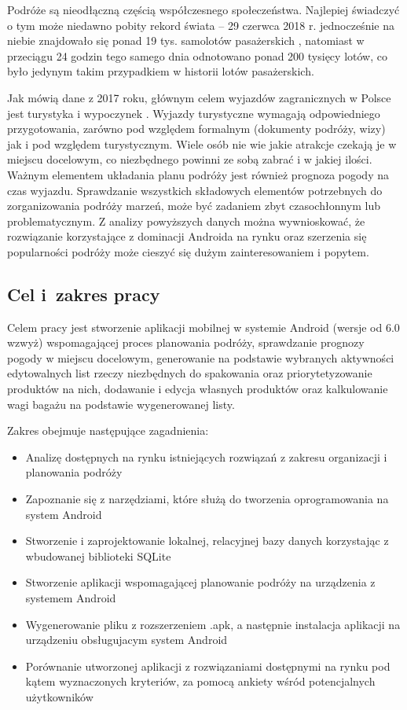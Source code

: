 \documentclass[a4paper,12pt]{article}
\begin{document}
Podróże są nieodłączną częścią współczesnego społeczeństwa. Najlepiej świadczyć o tym może niedawno pobity rekord świata – 29 czerwca 2018 r. jednocześnie na niebie znajdowało się ponad 19 tys. samolotów pasażerskich \cite{flightradar}, natomiast w przeciągu 24 godzin tego samego dnia odnotowano ponad 200 tysięcy lotów\cite{flightradar}, co było jedynym takim przypadkiem w historii lotów pasażerskich.

Jak mówią dane z 2017 roku, głównym celem wyjazdów zagranicznych w Polsce jest turystyka i wypoczynek \cite{msit}. Wyjazdy turystyczne wymagają odpowiedniego przygotowania, zarówno pod względem formalnym (dokumenty podróży, wizy) jak i pod względem turystycznym. Wiele osób nie wie jakie atrakcje czekają je w miejscu docelowym, co niezbędnego powinni ze sobą zabrać i w jakiej ilości. Ważnym elementem układania planu podróży jest również prognoza pogody na czas wyjazdu. Sprawdzanie wszystkich składowych elementów potrzebnych do zorganizowania podróży marzeń, może być zadaniem zbyt czasochłonnym lub problematycznym. Z analizy powyższych danych można wywnioskować, że rozwiązanie korzystające z dominacji Androida na rynku oraz szerzenia się popularności podróży może cieszyć się dużym zainteresowaniem i popytem.

\subsection{Cel i~zakres pracy}
Celem pracy jest stworzenie aplikacji mobilnej w systemie Android (wersje od 6.0 wzwyż) wspomagającej proces planowania podróży, sprawdzanie prognozy pogody w miejscu docelowym, generowanie na podstawie wybranych aktywności edytowalnych list rzeczy niezbędnych do spakowania oraz priorytetyzowanie produktów na nich, dodawanie i edycja własnych produktów oraz kalkulowanie wagi bagażu na podstawie wygenerowanej listy.

Zakres obejmuje następujące zagadnienia:

\begin{itemize}
    \item Analizę dostępnych na rynku istniejących rozwiązań z zakresu organizacji i planowania podróży
    \item Zapoznanie się z narzędziami, które służą do tworzenia oprogramowania na system Android
		\item Stworzenie i zaprojektowanie lokalnej, relacyjnej bazy danych korzystając z wbudowanej biblioteki SQLite
		\item Stworzenie aplikacji wspomagającej planowanie podróży na urządzenia z systemem Android
		\item Wygenerowanie pliku z rozszerzeniem .apk, a następnie instalacja aplikacji na urządzeniu obsługujacym system Android
		\item Porównanie utworzonej aplikacji z rozwiązaniami dostępnymi na rynku pod kątem wyznaczonych kryteriów, za pomocą ankiety wśród potencjalnych użytkowników
\end{itemize}
\end{document}
